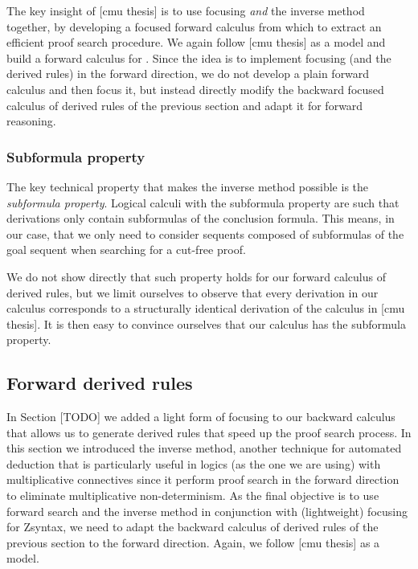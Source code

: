 The key insight of [cmu thesis] is to use focusing \emph{and} the inverse method
together, by developing a focused forward calculus from which to extract an
efficient proof search procedure.  We again follow [cmu thesis] as a model and
build a forward calculus for \zss{}. Since the idea is to implement focusing
(and the derived rules) in the forward direction, we do not develop a plain
forward calculus and then focus it, but instead directly modify the backward
focused calculus of derived rules of the previous section and adapt it for
forward reasoning.

\subsubsection{Subformula property}

The key technical property that makes the inverse method possible is the
\emph{subformula property}. Logical calculi with the subformula property are
such that derivations only contain subformulas of the conclusion formula. This
means, in our case, that we only need to consider sequents composed of
subformulas of the goal sequent when searching for a cut-free proof.

We do not show directly that such property holds for our forward calculus of
derived rules, but we limit ourselves to observe that every derivation in our
calculus corresponds to a structurally identical derivation of the calculus in
[cmu thesis]. It is then easy to convince ourselves that our calculus has the
subformula property.

\subsection{Forward derived rules}

In Section [TODO] we added a light form of focusing to our backward calculus
that allows us to generate derived rules that speed up the proof search process.
In this section we introduced the inverse method, another technique for
automated deduction that is particularly useful in logics (as the one we are
using) with multiplicative connectives since it perform proof search in the
forward direction to eliminate multiplicative non-determinism. As the final
objective is to use forward search and the inverse method in conjunction with
(lightweight) focusing for Zsyntax, we need to adapt the backward calculus of
derived rules of the previous section to the forward direction. Again, we follow
[cmu thesis] as a model.

